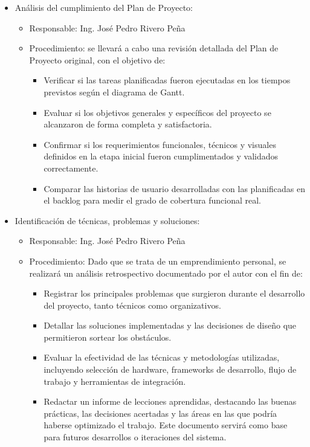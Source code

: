 \documentclass[
11pt, %
]{charter}
\begin{document}
\begin{itemize}
	\item Análisis del cumplimiento del Plan de Proyecto:
	      \begin{itemize}
		      \item Responsable: Ing. José Pedro Rivero Peña
		      \item Procedimiento: se llevará a cabo una revisión detallada del Plan de Proyecto original, con el objetivo de:
		            \begin{itemize}
			            \item Verificar si las tareas planificadas fueron ejecutadas en los tiempos previstos según el diagrama de Gantt.
			            \item Evaluar si los objetivos generales y específicos del proyecto se alcanzaron de forma completa y satisfactoria.
			            \item Confirmar si los requerimientos funcionales, técnicos y visuales definidos en la etapa inicial fueron cumplimentados y validados correctamente.
			            \item Comparar las historias de usuario desarrolladas con las planificadas en el backlog para medir el grado de cobertura funcional real.
		            \end{itemize}
	      \end{itemize}
	
	\item Identificación de técnicas, problemas y soluciones:
	      \begin{itemize}
		      \item Responsable: Ing. José Pedro Rivero Peña
		      \item Procedimiento: Dado que se trata de un emprendimiento personal, se realizará un análisis retrospectivo documentado por el autor con el fin de:
		            \begin{itemize}
			            \item Registrar los principales problemas que surgieron durante el desarrollo del proyecto, tanto técnicos como organizativos.
			            \item Detallar las soluciones implementadas y las decisiones de diseño que permitieron sortear los obstáculos.
			            \item Evaluar la efectividad de las técnicas y metodologías utilizadas, incluyendo selección de hardware, frameworks de desarrollo, flujo de trabajo y herramientas de integración.
			            \item Redactar un informe de lecciones aprendidas, destacando las buenas prácticas, las decisiones acertadas y las áreas en las que podría haberse optimizado el trabajo. Este documento servirá como base para futuros desarrollos o iteraciones del sistema.
		            \end{itemize}
	      \end{itemize}


\end{itemize}
\end{document}
